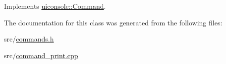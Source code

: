 Implements \hyperlink{classuiconsole_1_1Command_a5c4d205b1de13a6b3d0db73ddc7ebefa}{uiconsole::Command}.



The documentation for this class was generated from the following files:\begin{DoxyCompactItemize}
\item 
src/\hyperlink{commands_8h}{commands.h}\item 
src/\hyperlink{command__print_8cpp}{command\_\-print.cpp}\end{DoxyCompactItemize}
